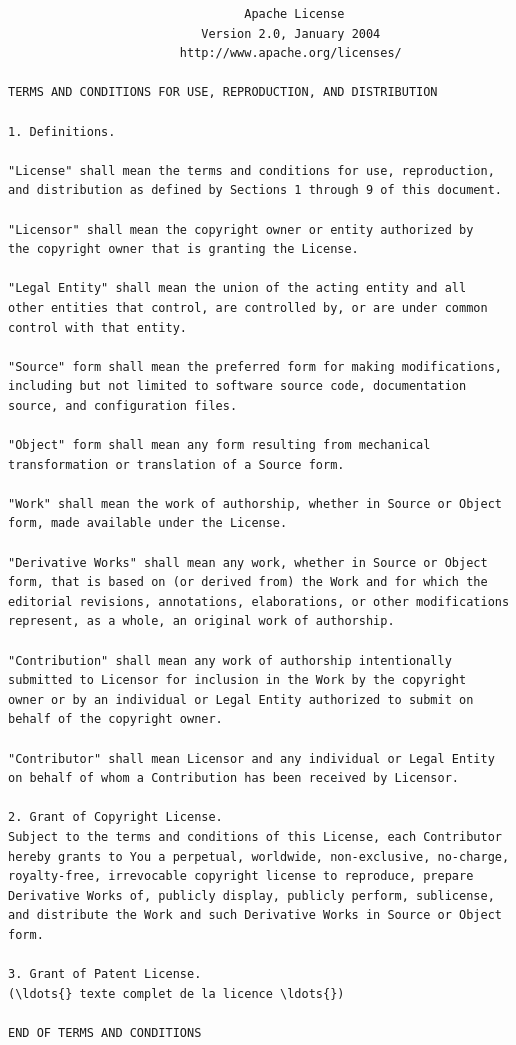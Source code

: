 \documentclass[12pt,oneside]{article}
\begin{document}
\begin{small}
\begin{verbatim}
                                 Apache License
                           Version 2.0, January 2004
                        http://www.apache.org/licenses/

TERMS AND CONDITIONS FOR USE, REPRODUCTION, AND DISTRIBUTION

1. Definitions.

"License" shall mean the terms and conditions for use, reproduction,
and distribution as defined by Sections 1 through 9 of this document.

"Licensor" shall mean the copyright owner or entity authorized by
the copyright owner that is granting the License.

"Legal Entity" shall mean the union of the acting entity and all
other entities that control, are controlled by, or are under common
control with that entity.

"Source" form shall mean the preferred form for making modifications,
including but not limited to software source code, documentation
source, and configuration files.

"Object" form shall mean any form resulting from mechanical
transformation or translation of a Source form.

"Work" shall mean the work of authorship, whether in Source or Object
form, made available under the License.

"Derivative Works" shall mean any work, whether in Source or Object
form, that is based on (or derived from) the Work and for which the
editorial revisions, annotations, elaborations, or other modifications
represent, as a whole, an original work of authorship.

"Contribution" shall mean any work of authorship intentionally
submitted to Licensor for inclusion in the Work by the copyright
owner or by an individual or Legal Entity authorized to submit on
behalf of the copyright owner.

"Contributor" shall mean Licensor and any individual or Legal Entity
on behalf of whom a Contribution has been received by Licensor.

2. Grant of Copyright License.
Subject to the terms and conditions of this License, each Contributor
hereby grants to You a perpetual, worldwide, non-exclusive, no-charge,
royalty-free, irrevocable copyright license to reproduce, prepare
Derivative Works of, publicly display, publicly perform, sublicense,
and distribute the Work and such Derivative Works in Source or Object
form.

3. Grant of Patent License.
(\ldots{} texte complet de la licence \ldots{})

END OF TERMS AND CONDITIONS
\end{verbatim}
\end{small}
\end{document}
